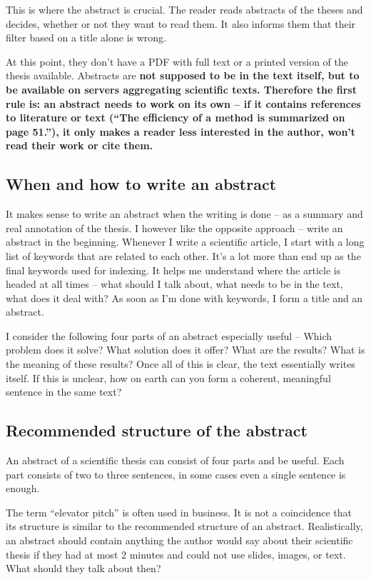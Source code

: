 This is where the abstract is crucial. The reader reads abstracts of the theses and decides, whether or not they want to read them. It also informs them that their filter based on a title alone is wrong.

At this point, they don't have a PDF with full text or a printed version of the thesis available. Abstracts are \bf not \rm supposed to be in the text itself, but to be available on servers aggregating scientific texts. Therefore the first rule is: an abstract needs to work on its own -- if it contains references to literature or text (``The efficiency of a method is summarized on page 51.''), it only makes a reader less interested in the author, won't read their work or cite them.


\subsection*{When and how to write an abstract}
It makes sense to write an abstract when the writing is done -- as a summary and real annotation of the thesis.
I however like the opposite approach -- write an abstract in the beginning. Whenever I write a scientific article, I start with a long list of keywords that are related to each other. It's a lot more than end up as the final keywords used for indexing. It helps me understand where the article is headed at all times -- what should I talk about, what needs to be in the text, what does it deal with? As soon as I'm done with keywords, I form a title and an abstract.

I consider the following four parts of an abstract especially useful -- Which problem does it solve? What solution does it offer? What are the results? What is the meaning of these results? Once all of this is clear, the text essentially writes itself. If this is unclear, how on earth can you form a coherent, meaningful sentence in the same text?


\subsection*{Recommended structure of the abstract}
An abstract of a scientific thesis can consist of four parts and be useful. Each part consists of two to three sentences, in some cases even a single sentence is enough.

The term ``elevator pitch'' is often used in business. It is not a coincidence that its structure is similar to the recommended structure of an abstract. Realistically, an abstract should contain anything the author would say about their scientific thesis if they had at most 2 minutes and could not use slides, images, or text. What should they talk about then?

